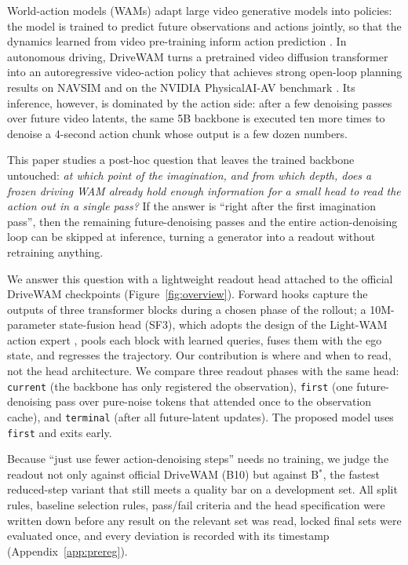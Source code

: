 \documentclass[10pt]{article}
\newcommand{\Bstar}{B$^{*}$}
\newcommand{\first}{\texttt{first}}
\newcommand{\current}{\texttt{current}}
\newcommand{\terminal}{\texttt{terminal}}
\begin{document}
World-action models (WAMs) adapt large video generative models into policies: the model is trained to predict future observations and actions jointly, so that the dynamics learned from video pre-training inform action prediction \citep{shi2026drivewam,li2026lightwam,ma2026fasterwam}. In autonomous driving, DriveWAM \citep{shi2026drivewam} turns a pretrained video diffusion transformer \citep{wan2025wan} into an autoregressive video-action policy that achieves strong open-loop planning results on NAVSIM \citep{dauner2024navsim} and on the NVIDIA PhysicalAI-AV benchmark \citep{nvidia2025physicalai}. Its inference, however, is dominated by the action side: after a few denoising passes over future video latents, the same 5B backbone is executed ten more times to denoise a 4-second action chunk whose output is a few dozen numbers.

This paper studies a post-hoc question that leaves the trained backbone untouched: \emph{at which point of the imagination, and from which depth, does a frozen driving WAM already hold enough information for a small head to read the action out in a single pass?} If the answer is ``right after the first imagination pass'', then the remaining future-denoising passes and the entire action-denoising loop can be skipped at inference, turning a generator into a readout without retraining anything.

We answer this question with a lightweight readout head attached to the official DriveWAM checkpoints (Figure~\ref{fig:overview}). Forward hooks capture the outputs of three transformer blocks during a chosen phase of the rollout; a 10M-parameter state-fusion head (SF3), which adopts the design of the Light-WAM action expert \citep{li2026lightwam}, pools each block with learned queries, fuses them with the ego state, and regresses the trajectory. Our contribution is where and when to read, not the head architecture. We compare three readout phases with the same head: \current{} (the backbone has only registered the observation), \first{} (one future-denoising pass over pure-noise tokens that attended once to the observation cache), and \terminal{} (after all future-latent updates). The proposed model uses \first{} and exits early.

Because ``just use fewer action-denoising steps'' needs no training, we judge the readout not only against official DriveWAM (B10) but against \Bstar{}, the fastest reduced-step variant that still meets a quality bar on a development set. All split rules, baseline selection rules, pass/fail criteria and the head specification were written down before any result on the relevant set was read, locked final sets were evaluated once, and every deviation is recorded with its timestamp (Appendix~\ref{app:prereg}).
\end{document}
